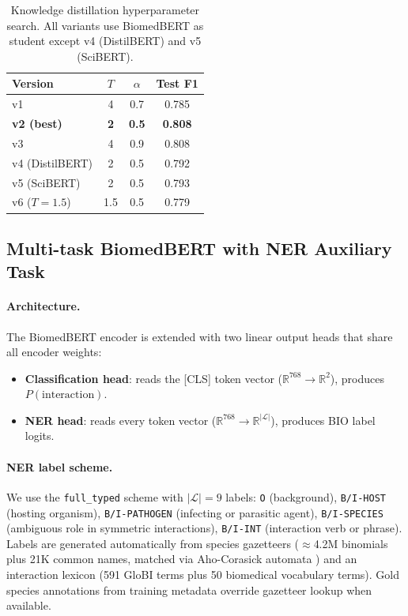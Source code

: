 \documentclass[12pt,a4paper]{article}
\begin{document}
\begin{table}[H]
\centering
\caption{Knowledge distillation hyperparameter search.
All variants use BiomedBERT as student except v4 (DistilBERT) and v5 (SciBERT).}
\label{tab:distillation}
\begin{tabular}{lccc}
\toprule
\textbf{Version} & $T$ & $\alpha$ & \textbf{Test F1} \\
\midrule
v1 & 4 & 0.7 & 0.785 \\
\rowcolor{bestrow}
\textbf{v2 (best)} & \textbf{2} & \textbf{0.5} & \textbf{0.808} \\
v3 & 4 & 0.9 & 0.808 \\
v4 (DistilBERT) & 2 & 0.5 & 0.792 \\
v5 (SciBERT) & 2 & 0.5 & 0.793 \\
v6 ($T=1.5$) & 1.5 & 0.5 & 0.779 \\
\bottomrule
\end{tabular}
\end{table}

\subsection{Multi-task BiomedBERT with NER Auxiliary Task}
\label{sec:multitask}

\paragraph{Architecture.}
The BiomedBERT encoder is extended with two linear output heads that share
all encoder weights:
\begin{itemize}
    \item \textbf{Classification head}: reads the [CLS] token vector
    ($\mathbb{R}^{768} \to \mathbb{R}^2$), produces $P(\text{interaction})$.
    \item \textbf{NER head}: reads every token vector
    ($\mathbb{R}^{768} \to \mathbb{R}^{|\mathcal{L}|}$), produces BIO label logits.
\end{itemize}

\paragraph{NER label scheme.}
We use the \texttt{full\_typed} scheme with $|\mathcal{L}| = 9$ labels:
\texttt{O} (background), \texttt{B/I-HOST} (hosting organism),
\texttt{B/I-PATHOGEN} (infecting or parasitic agent),
\texttt{B/I-SPECIES} (ambiguous role in symmetric interactions),
\texttt{B/I-INT} (interaction verb or phrase).
Labels are generated automatically from species gazetteers
($\approx$4.2M binomials plus 21K common names, matched via Aho-Corasick
automata \citealt{aho1975efficient}) and an interaction lexicon (591 GloBI
terms plus 50 biomedical vocabulary terms). Gold species annotations from
training metadata override gazetteer lookup when available.
\end{document}
